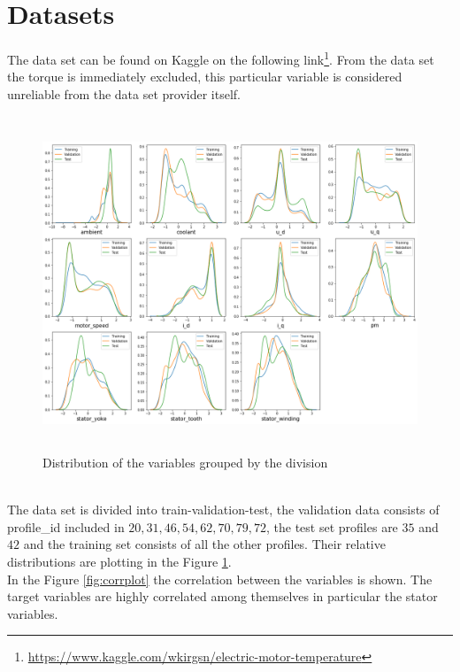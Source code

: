 \section{Datasets}
The data set can be found on Kaggle on the following link\footnote{\href{https://www.kaggle.com/wkirgsn/electric-motor-temperature}{https://www.kaggle.com/wkirgsn/electric-motor-temperature}}.
From the data set the torque is immediately excluded, this particular variable is considered unreliable from the data set provider itself.
\begin{figure}[!h]
    \centering
    \includegraphics[width=\linewidth, height=10cm]{imgs/dist_plot.png}
    \caption{Distribution of the variables grouped by the division}
    \label{fig:dist_plot}
\end{figure}\\
The data set is divided into train-validation-test, the validation data consists of profile\_id included in $20,31,46,54, 62, 70, 79, 72$, the test set profiles are $35$ and $42$ and the training set consists of all the other profiles. Their relative distributions are plotting in the Figure \ref{fig:dist_plot}.\\
In the Figure \ref{fig:corrplot} the correlation between the variables is shown. The target variables are highly correlated among themselves in particular the stator variables.
